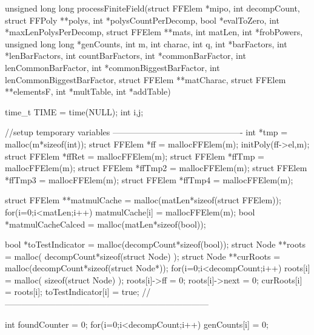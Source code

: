 \begin{ccode}[caption={Aus \url{../Sage/enumeratePCNs.c}},
  label=lst:processFiniteField]
unsigned long long processFiniteField(struct FFElem *mipo, int decompCount,
        struct FFPoly **polys, int *polysCountPerDecomp,
        bool *evalToZero, int *maxLenPolysPerDecomp,
        struct FFElem **mats, int matLen, int *frobPowers,
        unsigned long long *genCounts, int m, int charac, int q,
        int *barFactors, int *lenBarFactors, int countBarFactors,
        int *commonBarFactor, int lenCommonBarFactor,
        int *commonBiggestBarFactor, int lenCommonBiggestBarFactor,
        struct FFElem **matCharac, struct FFElem **elementsF,
        int *multTable, int *addTable){
    time_t TIME = time(NULL);
    int i,j;

    //setup temporary variables ----------------------------------------------
    int *tmp = malloc(m*sizeof(int));
    struct FFElem *ff = mallocFFElem(m);
    initPoly(ff->el,m);
    struct FFElem *ffRet = mallocFFElem(m);
    struct FFElem *ffTmp = mallocFFElem(m);
    struct FFElem *ffTmp2 = mallocFFElem(m);
    struct FFElem *ffTmp3 = mallocFFElem(m);
    struct FFElem *ffTmp4 = mallocFFElem(m);
    
    struct FFElem **matmulCache = malloc(matLen*sizeof(struct FFElem));
    for(i=0;i<matLen;i++) matmulCache[i] = mallocFFElem(m);
    bool *matmulCacheCalced = malloc(matLen*sizeof(bool));
    
    bool *toTestIndicator = malloc(decompCount*sizeof(bool));
    struct Node **roots = malloc( decompCount*sizeof(struct Node) );
    struct Node **curRoots = malloc(decompCount*sizeof(struct Node*));
    for(i=0;i<decompCount;i++){
        roots[i] = malloc( sizeof(struct Node) );
        roots[i]->ff = 0;
        roots[i]->next = 0;
        curRoots[i] = roots[i];
        toTestIndicator[i] = true;
    }
    //------------------------------------------------------------------------
    
    int foundCounter = 0;
    for(i=0;i<decompCount;i++) genCounts[i] = 0;

}
\end{ccode}
